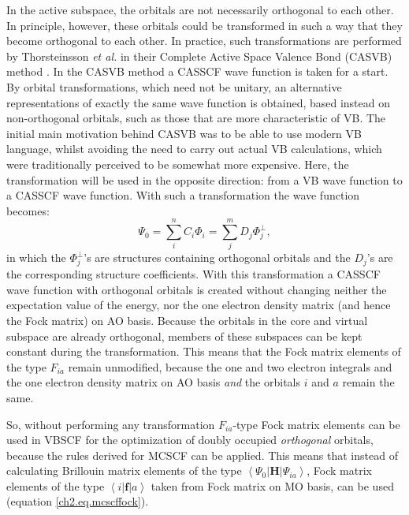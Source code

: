 In the active subspace, the orbitals are not necessarily orthogonal to each other. In principle, however, these orbitals could be transformed in such a way that they become orthogonal to each other. In practice, such transformations are performed by Thorsteinsson \textit{et al.} in their Complete Active Space Valence Bond (CASVB) method \cite{thor1,thor2,thor3,thor4}. In the CASVB method a CASSCF wave function is taken for a start. By orbital transformations, which need not be unitary, an alternative representations of exactly the same wave function is obtained, based instead on non-orthogonal orbitals, such as those that are more characteristic of VB. The initial main motivation behind CASVB was to be able to use modern VB language, whilst avoiding the need to carry out actual VB calculations, which were traditionally perceived to be somewhat more expensive. Here, the transformation will be used in the opposite direction: from a VB wave function to a CASSCF wave function. With such a transformation the wave function becomes:
\begin{equation}
\Psi_0 = \sum_{i}^{n} C_i \Phi_i = \sum_{j}^{m} D_j \Phi^{\mathrm{\bot }}_j,
\label{ch2.eq.vbtrans}
\end{equation}
in which the $\Phi^{\mathrm{\bot }}_j$'s are structures containing orthogonal orbitals and the $D_j$'s are the corresponding structure coefficients. With this transformation a CASSCF wave function with orthogonal orbitals is created without changing neither the expectation value of the energy, nor the one electron density matrix (and hence the Fock matrix) on AO basis. Because the orbitals in the core and virtual subspace are already orthogonal, members of these subspaces can be kept constant during the transformation. This means that the Fock matrix elements of the type $F_{ia}$ remain unmodified, because the one and two electron integrals and the one electron density matrix on AO basis \textit{and} the orbitals $i$ and $a$ remain the same.

So, without performing any transformation $F_{ia}$-type Fock matrix elements can be used in VBSCF for the optimization of doubly occupied \textit{orthogonal} orbitals, because the rules derived for MCSCF can be applied. This means that instead of calculating Brillouin matrix elements of the type $\left < \Psi_0 | \mathbf{H} | \Psi_{ia} \right >$, Fock matrix elements of the type $\left < i | \mathbf{f} | a \right > $ taken from Fock matrix on MO basis, can be used (equation \ref{ch2.eq.mcscffock}).

